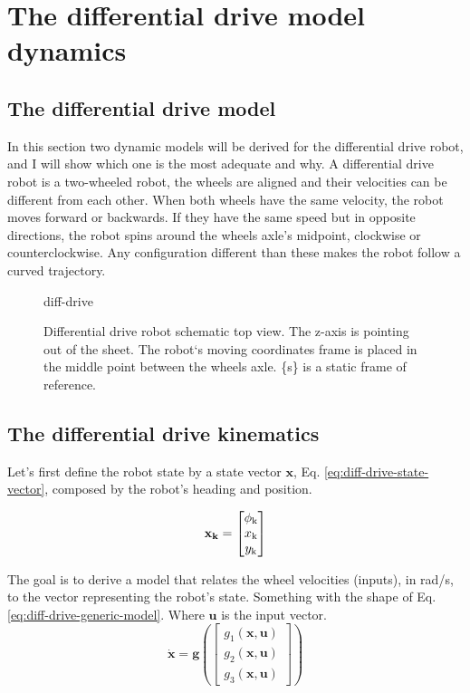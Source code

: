 \documentclass[12pt]{article}
\begin{document}
\section{The differential drive model dynamics}
\subsection{The differential drive model}
In this section two dynamic models will be derived for the differential drive robot, and I will show which one is the most adequate and why.
A differential drive robot is a two-wheeled robot, the wheels are aligned and their velocities can be different from each other. When both wheels have the same velocity, the robot moves forward or backwards. If they have the same speed but in opposite directions, the robot spins around the wheels axle's midpoint, clockwise or counterclockwise. Any configuration different than these makes the robot follow a curved trajectory.  

 \begin{figure}[h]
    \centering
    {diff-drive}
    \caption{Differential drive robot schematic top view. The z-axis is pointing out of the sheet. The robot`s moving coordinates frame is placed in the middle point between the wheels axle. \{s\} is a static frame of reference.}
     \label{fig:diff-drive-schematic}
 \end{figure}

 \subsection{The differential drive kinematics}
 Let's first define the robot state by a state vector $\mathbf{x}$, Eq. \ref{eq:diff-drive-state-vector}, composed by the robot's heading and position.

 \begin{equation}
     \boldsymbol{\mathbf{x_k}} = \begin{bmatrix}
         \phi_\mathrm{k} \\ x_\mathrm{k} \\ y_\mathrm{k} 
     \end{bmatrix}
     \label{eq:diff-drive-state-vector}
 \end{equation}

 The goal is to derive a model that relates the wheel velocities (inputs), in \si[per-mode=symbol]{\radian\per\second}, to the vector representing the robot's state. Something with the shape of Eq. \ref{eq:diff-drive-generic-model}. Where $\mathbf{u}$ is the input vector.
 \begin{equation}
     \mathbf{\dot{x}} = \boldsymbol{g}\left( \begin{bmatrix}
         g_1(\mathbf{x}, \mathbf{u}) \\ g_2(\mathbf{x}, \mathbf{u}) \\ g_3(\mathbf{x}, \mathbf{u})\end{bmatrix} \right)
     \label{eq:diff-drive-generic-model}
 \end{equation}
\end{document}
